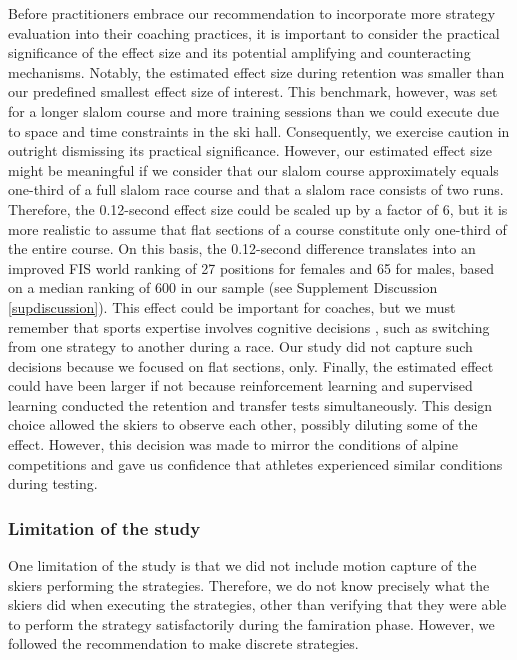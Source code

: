 \documentclass[pdflatex,sn-mathphys-num]{sn-jnl}%
\theoremstyle{thmstyleone}%
\theoremstyle{thmstyletwo}%
\theoremstyle{thmstylethree}%
\begin{document}
Before practitioners embrace our recommendation to incorporate more strategy evaluation into their coaching practices, it is important to consider the practical significance of the effect size and its potential amplifying and counteracting mechanisms\cite{anvari_not_2023}. Notably, the estimated effect size during retention was smaller than our predefined smallest effect size of interest. This benchmark, however, was set for a longer slalom course and more training sessions than we could execute due to space and time constraints in the ski hall. Consequently, we exercise caution in outright dismissing its practical significance. However, our estimated effect size might be meaningful if we consider that our slalom course approximately equals one-third of a full slalom race course and that a slalom race consists of two runs. Therefore, the 0.12-second effect size could be scaled up by a factor of 6, but it is more realistic to assume that flat sections of a course constitute only one-third of the entire course. On this basis, the 0.12-second difference translates into an improved FIS world ranking of 27 positions for females and 65 for males, based on a median ranking of 600 in our sample (see Supplement Discussion \ref{supdiscussion}). This effect could be important for coaches, but we must remember that sports expertise involves cognitive decisions  \cite{mangalam_investigating_2023, krakauer_motor_2019}, such as switching from one strategy to another during a race. Our study did not capture such decisions because we focused on flat sections, only. Finally, the estimated effect could have been larger if not because reinforcement learning and supervised learning conducted the retention and transfer tests simultaneously. This design choice allowed the skiers to observe each other, possibly diluting some of the effect. However, this decision was made to mirror the conditions of alpine competitions and gave us confidence that athletes experienced similar conditions during testing.


\subsubsection{Limitation of the study}

One limitation of the study is that we did not include motion capture of the skiers performing the strategies. Therefore, we do not know precisely what the skiers did when executing the strategies, other than verifying that they were able to perform the strategy satisfactorily during the famiration phase. However, we followed the recommendation to make discrete strategies. 
\end{document}
